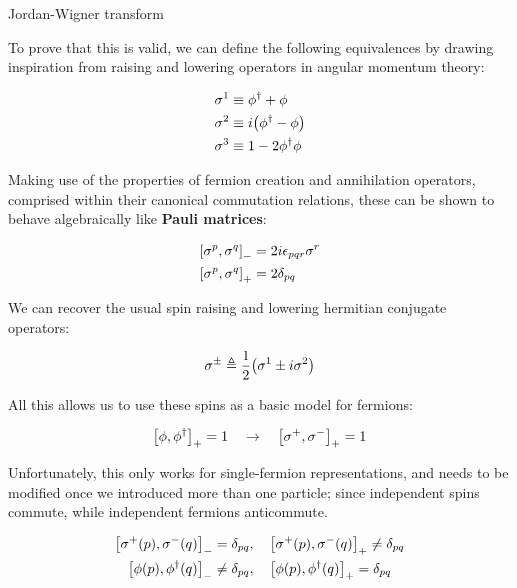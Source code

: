 \documentclass[9pt, handout, aspectratio=169]{beamer}	%
\begin{document}

\begin{frame}[allowframebreaks]{Jordan-Wigner transform}

	To prove that this is valid, we can define the following equivalences by drawing inspiration from raising and lowering operators in angular momentum theory:

	\begin{align*}
		\sigma^{1} &\equiv \phi^{\dagger} + \phi \\
		\sigma^{2} &\equiv i\qty(\phi^{\dagger} - \phi) \\
		\sigma^{3} &\equiv 1 - 2\phi^{\dagger}\phi
	\end{align*}

	Making use of the properties of fermion creation and annihilation operators, comprised within their canonical commutation relations, these can be shown to behave algebraically like \textbf{Pauli matrices}:

	\begin{align*}
	  \com{\sigma^{p}}{\sigma^{q}} &= 2i\epsilon_{pqr}\sigma^{r} \\
	  \acom{\sigma^{p}}{\sigma^{q}} &= 2\delta_{pq}
	\end{align*}

\break

	We can recover the usual spin raising and lowering hermitian conjugate operators:

	\begin{gather}
	  \sigma^{\pm} \triangleq \frac{1}{2}\qty(\sigma^{1} \pm i\sigma^{2})
	\end{gather}

	All this allows us to use these spins as a basic model for fermions:

	\begin{gather} \label{eq:anticommutator-for-single-particle-jordan-wigner}
	  \acom{\phi}{\phi^{\dagger}} = 1 \qra \acom{\sigma^{+}}{\sigma^{-}} = 1
	\end{gather}

	Unfortunately, this only works for single-fermion representations, and needs to be modified once we introduced more than one particle; since independent spins commute, while independent fermions anticommute.

	\begin{gather*}
	  \com{\sigma^{+}(p)}{\sigma^{-}(q)} = \delta_{pq} \qc
	    \acom{\sigma^{+}(p)}{\sigma^{-}(q)} \neq \delta_{pq} \\
	  \com{\phi(p)}{\phi^{\dagger}(q)} \neq \delta_{pq} \qc
	    \acom{\phi(p)}{\phi^{\dagger}(q)} = \delta_{pq}
	\end{gather*}


\end{frame}
\end{document}
